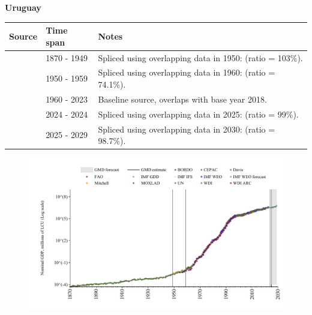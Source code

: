 \documentclass[12pt,a4paper,landscape]{article}
\begin{document}
\begin{adjustbox}{max totalsize={\paperwidth}{\paperheight},center}
\begin{minipage}[t][\textheight][t]{\textwidth}
\vspace*{0.5cm}
{}
\begin{center}
{\Large\bfseries Uruguay}
\end{center}
\vspace{0.5cm}
\begin{table}[H]
\centering
\small
\begin{tabular}{|l|l|l|}
\hline
\textbf{Source} & \textbf{Time span} & \textbf{Notes} \\
\hline
\rowcolor{white}\cite{Davis}& 1870 - 1949 &Spliced using overlapping data in 1950: (ratio = 103\%).\\
\rowcolor{lightgray}\cite{IMF_GDD}& 1950 - 1959 &Spliced using overlapping data in 1960: (ratio = 74.1\%).\\
\rowcolor{white}\cite{WDI}& 1960 - 2023 &Baseline source, overlaps with base year 2018.\\
\rowcolor{lightgray}\cite{IMF_IFS}& 2024 - 2024 &Spliced using overlapping data in 2025: (ratio = 99\%).\\
\rowcolor{white}\cite{IMF_WEO_forecast}& 2025 - 2029 &Spliced using overlapping data in 2030: (ratio = 98.7\%).\\
\hline
\end{tabular}
\end{table}
\begin{figure}[H]
\centering
\includegraphics[width=\textwidth,height=0.6\textheight,keepaspectratio]{graphs/URY_nGDP.pdf}
\end{figure}
\end{minipage}
\end{adjustbox}
\end{document}
